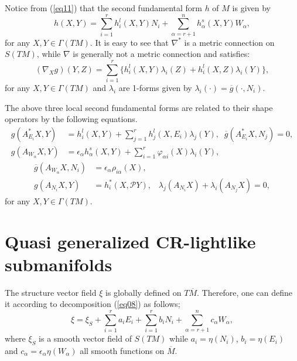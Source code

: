 \documentclass[reqno, 12pt]{amsart}
\numberwithin{equation}{section}
\begin{document}
Notice from (\ref{eq11}) that the second fundamental form $h$  of $M$ is given by
 \begin{equation}\label{h1}
 h(X,Y)=\sum_{i=1}^r h_i^l(X,Y)N_i+\sum_{\alpha=r+1}^n h_\alpha^s(X,Y)W_\alpha,
\end{equation}
for any $X,Y\in \Gamma(TM)$.  It is easy to see that  $\nabla^*$ is a metric connection on $S(TM)$, while $\nabla$ is generally not a metric connection and satisfies:
      \begin{equation}\label{metric}
         (\nabla_X g)(Y,Z)=\sum_{i=1}^r\{h_i^l(X,Y)\lambda_i(Z)+h_i^l(X,Z)\lambda_i(Y)\},
      \end{equation}
for any $X,Y\in \Gamma(TM)$ and $\lambda_i$ are 1-forms given by $\lambda_i(\cdot)=\overline{g}(\cdot,N_i)$.
     
The above three local second fundamental forms are related to their shape operators by the following equations.
      \begin{align} 
           g(A_{E_i}^*X,Y)&=h_i^l(X,Y)+\sum_{j=1}^rh_j^l(X,E_i)\lambda_j(Y), \;\; \overline{g}(A_{E_i}^*X,N_j)=0,\nonumber \\
          g(A_{W_\alpha}X,Y) &=\epsilon_\alpha h_\alpha^s(X,Y)+ \sum_{i=1}^r \varphi_{\alpha i}(X)\lambda_i(Y),\nonumber 
          \end{align}
           \begin{align}
          \overline{g}(A_{W_\alpha}X,N_i)& =\epsilon_\alpha \rho_{i\alpha}(X), \nonumber\\
          g(A_{N_i}X,Y)& =h_i^*(X,\mathcal{P}Y),\;\;\; \lambda_j(A_{N_i}X)+\lambda_i(A_{N_j}X)=0,\nonumber
      \end{align}
for any $X,Y\in \Gamma(TM)$. 

\section{Quasi generalized CR-lightlike submanifolds}\label{QGCR}

The structure vector field $\xi$ is globally defined on $T\overline{M}$. Therefore, one can define it according to decomposition (\ref{eq08}) as follows;
         \begin{equation}\label{eq2}
              \xi=\xi_{S}+\sum_{i=1}^ra_i E_i+\sum_{i=1}^rb_i N_i+\sum_{\alpha=r+1}^nc_\alpha W_\alpha,
         \end{equation}
where $\xi_{S}$ is a smooth vector field of $S(TM)$ while $a_i=\eta(N_i)$, $b_i=\eta(E_i)$ and $c_\alpha=\epsilon_\alpha\eta(W_\alpha)$ all smooth functions on $\overline{M}$.
\end{document}
